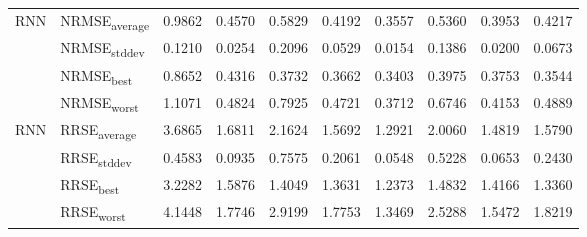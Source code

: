 {\begin{longtable}{l l c c c c c c c c}
\cmidrule(lr){2-10}
\multirow{4}{*}{RNN} & NRMSE\textsubscript{average} & 0.9862 & 0.4570 & 0.5829 & 0.4192 & 0.3557 & 0.5360 & 0.3953 & 0.4217 \\
 & NRMSE\textsubscript{stddev} & 0.1210 & 0.0254 & 0.2096 & 0.0529 & 0.0154 & 0.1386 & 0.0200 & 0.0673 \\
 & NRMSE\textsubscript{best} & 0.8652 & 0.4316 & 0.3732 & 0.3662 & 0.3403 & 0.3975 & 0.3753 & 0.3544 \\
 & NRMSE\textsubscript{worst} & 1.1071 & 0.4824 & 0.7925 & 0.4721 & 0.3712 & 0.6746 & 0.4153 & 0.4889 \\
\cmidrule(lr){2-10}
\multirow{4}{*}{RNN} & RRSE\textsubscript{average} & 3.6865 & 1.6811 & 2.1624 & 1.5692 & 1.2921 & 2.0060 & 1.4819 & 1.5790 \\
 & RRSE\textsubscript{stddev} & 0.4583 & 0.0935 & 0.7575 & 0.2061 & 0.0548 & 0.5228 & 0.0653 & 0.2430 \\
 & RRSE\textsubscript{best} & 3.2282 & 1.5876 & 1.4049 & 1.3631 & 1.2373 & 1.4832 & 1.4166 & 1.3360 \\
 & RRSE\textsubscript{worst} & 4.1448 & 1.7746 & 2.9199 & 1.7753 & 1.3469 & 2.5288 & 1.5472 & 1.8219 \\
\cmidrule(lr){2-10}
\end{longtable}
}
